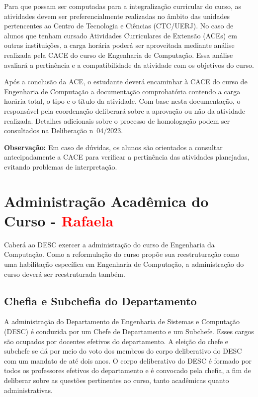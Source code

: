 Para que possam ser computadas para a integralização curricular do curso, as atividades devem ser preferencialmente realizadas no âmbito das unidades pertencentes ao Centro de Tecnologia e Ciências (CTC/UERJ). No caso de alunos que tenham cursado Atividades Curriculares de Extensão (ACEs) em outras instituições, a carga horária poderá ser aproveitada mediante análise realizada pela CACE do curso de Engenharia de Computação. Essa análise avaliará a pertinência e a compatibilidade da atividade com os objetivos do curso.

Após a conclusão da ACE, o estudante deverá encaminhar à CACE do curso de Engenharia de Computação a documentação comprobatória contendo a carga horária total, o tipo e o título da atividade. Com base nesta documentação, o responsável pela coordenação deliberará sobre a aprovação ou não da atividade realizada. Detalhes adicionais sobre o processo de homologação podem ser consultados na Deliberação n\textordmasculine~04/2023.

\textbf{Observação:} Em caso de dúvidas, os alunos são orientados a consultar antecipadamente a CACE para verificar a pertinência das atividades planejadas, evitando problemas de interpretação.


\section{Administração Acadêmica do Curso - \textcolor{red}{Rafaela}}

Caberá ao DESC exercer a administração do curso de Engenharia da Computação.
Como a reformulação do curso propõe sua reestruturação como uma habilitação específica em Engenharia de Computação, a administração do curso deverá ser reestruturada também.

\subsection{Chefia e Subchefia do Departamento}

A administração do Departamento de Engenharia de Sistemas e Computação (DESC) é conduzida por um Chefe de Departamento e um Subchefe. Esses cargos são ocupados por docentes efetivos do departamento. A eleição do chefe e subchefe se dá por meio do voto dos membros do corpo deliberativo do DESC com um mandato de até dois anos. O corpo deliberativo do DESC é formado por todos os professores efetivos do departamento e é convocado pela chefia, a fim de deliberar sobre as questões pertinentes ao curso, tanto acadêmicas quanto administrativas.

